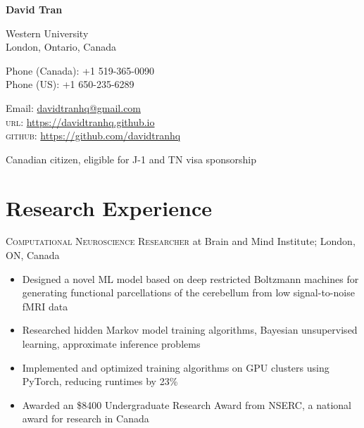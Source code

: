 \documentclass[11pt]{article} %
\begin{document}

{\LARGE\bfseries David Tran} %
\bigskip\bigskip\medskip %

Western University\\ %
London, Ontario, Canada\\
\medskip %

Phone (Canada): +1 519-365-0090\\ %
Phone (US): +1 650-235-6289
\medskip %

Email: \href{mailto:davidtranhq@gmail.com}{davidtranhq@gmail.com}\\ %
\textsc{url}: \href{https://davidtranhq.github.io}{https://davidtranhq.github.io}\\ %
\textsc{github}: \href{https://github.com/davidtranhq}{https://github.com/davidtranhq}\\
\medskip


Canadian citizen, eligible for J-1 and TN visa sponsorship


\vspace{0.06\textheight} %


\section*{Research Experience}

\textsc{Computational Neuroscience Researcher} at Brain and Mind Institute; London, ON, Canada

\begin{itemize}
	\item Designed a novel ML model based on deep restricted Boltzmann machines for generating functional parcellations of the cerebellum from low signal-to-noise fMRI data
	\item Researched hidden Markov model training algorithms, Bayesian unsupervised learning, approximate inference problems
  \item Implemented and optimized training algorithms on GPU clusters using PyTorch, reducing runtimes by 23\%
  \item Awarded an \$8400 Undergraduate Research Award from NSERC, a national award for research in Canada
\end{itemize}
\end{document}

